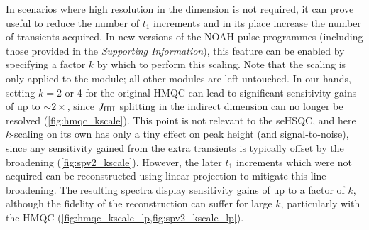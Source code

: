 \documentclass[11pt]{article}
\newcommand*{\nitrogen}{\ce{^{15}N}}
\newcommand*{\jhh}{J_{\ce{HH}}}
\newcommand*{\SInf}{\textit{Supporting Information}}
\begin{document}
In scenarios where high resolution in the \nitrogen{} dimension is not required, it can prove useful to reduce the number of $t_1$ increments and in its place increase the number of transients acquired.\autocite{Perez-Trujillo2007MRC, Parella2010CMR}
In new versions of the NOAH pulse programmes (including those provided in the \SInf{}), this feature can be enabled by specifying a factor $k$ by which to perform this scaling.
Note that the scaling is only applied to the \nitrogen{} module; all other modules are left untouched.
In our hands, setting $k = 2$ or 4 for the original \nitrogen{} HMQC can lead to significant sensitivity gains of up to $\sim 2\times$, since $\jhh$ splitting in the indirect dimension can no longer be resolved (\cref{fig:hmqc_kscale}).
This point is not relevant to the seHSQC, and here $k$-scaling on its own has only a tiny effect on peak height (and signal-to-noise), since any sensitivity gained from the extra transients is typically offset by the broadening (\cref{fig:spv2_kscale}).
However, the later $t_1$ increments which were not acquired can be reconstructed using linear projection\autocite{linearpred} to mitigate this line broadening.
The resulting spectra display sensitivity gains of up to a factor of $k$, although the fidelity of the reconstruction can suffer for large $k$, particularly with the HMQC (\cref{fig:hmqc_kscale_lp,fig:spv2_kscale_lp}).


\end{document}
